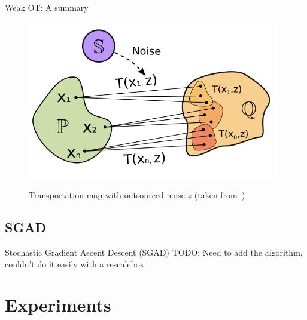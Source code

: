 \documentclass{beamer}
\begin{document}
\begin{frame}{Weak OT: A summary}
    \begin{figure}
        \centering
        \includegraphics[width=0.9\linewidth]{figures/transportation-plan.png}
        \label{transportation-map}
        \caption{Transportation map with outsourced noise $z$ (taken from~\cite{korotin-2022})}
    \end{figure}
\end{frame}

\subsection{SGAD}
\begin{frame}{Stochastic Gradient Ascent Descent (SGAD)}
    TODO: Need to add the algorithm, couldn't do it easily with a rescalebox.
\end{frame}

\section{Experiments}
\end{document}
